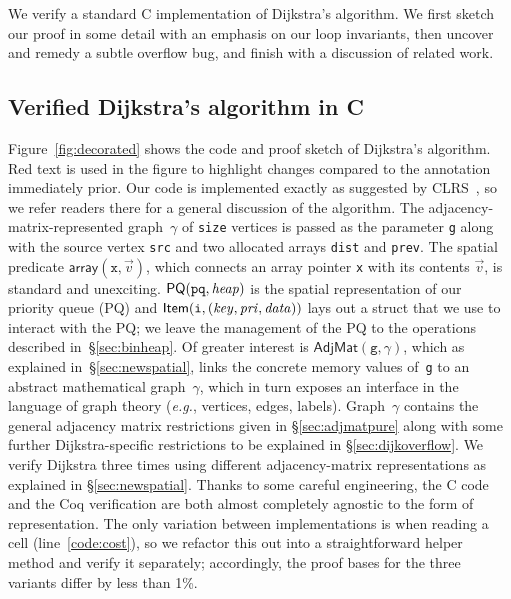 We verify a standard C implementation of Dijkstra's algorithm.
We first sketch our proof in some detail with an emphasis on our loop invariants,
then uncover and remedy a subtle overflow bug, and finish with a discussion
of related work.

\subsection{Verified Dijkstra's algorithm in C}
\label{sec:dijkoverview}

Figure~\ref{fig:decorated} shows the code and proof
sketch of Dijkstra's algorithm.
{\color{red}Red} text is used in the figure to highlight changes compared to the
annotation immediately prior.
Our code is implemented exactly
as suggested by CLRS~\cite{clrs}, so we refer readers there for a
general discussion of the algorithm.
The adjacency-matrix-represented graph~$\gamma$ of \texttt{size} vertices
is passed as the parameter \texttt{g} along with the source vertex \texttt{src}
and two allocated arrays \texttt{dist} and \texttt{prev}.
The spatial predicate $\mathsf{array}(\texttt{x},\vec{v})$, which connects
an array pointer \texttt{x} with its contents $\vec{v}$, is standard and unexciting.
$\mathsf{PQ}(\texttt{pq},\mathit{heap})$ is the spatial
representation of our priority queue (PQ) and
$\mathsf{Item}(\texttt{i},\mathit{(key, pri, data)})$
lays out a struct that we use to interact with the PQ;
we leave the management of the PQ to the operations described in~\S\ref{sec:binheap}.
Of greater interest is $\mathsf{AdjMat}(\texttt{g},\gamma)$, which as explained in~\S\ref{sec:newspatial}, links 
the concrete memory values of~\texttt{g} to an abstract mathematical
graph~$\gamma$, which in turn exposes an interface in the
language of graph theory (\emph{e.g.}, vertices, edges, labels).  Graph~$\gamma$ contains 
the general adjacency matrix restrictions given in \S\ref{sec:adjmatpure} along with some further
Dijkstra-specific restrictions to be explained in \S\ref{sec:dijkoverflow}.
We verify Dijkstra
three times using different adjacency-matrix representations as explained in \S\ref{sec:newspatial}.
Thanks to some careful engineering, the C code and
the Coq verification are both almost completely agnostic to
the form of representation. The only variation between implementations
is when reading a cell (line~\ref{code:cost}), so we
refactor this out into a straightforward helper method and
verify it separately; accordingly, the proof bases for the three variants differ by less than 1\%.

